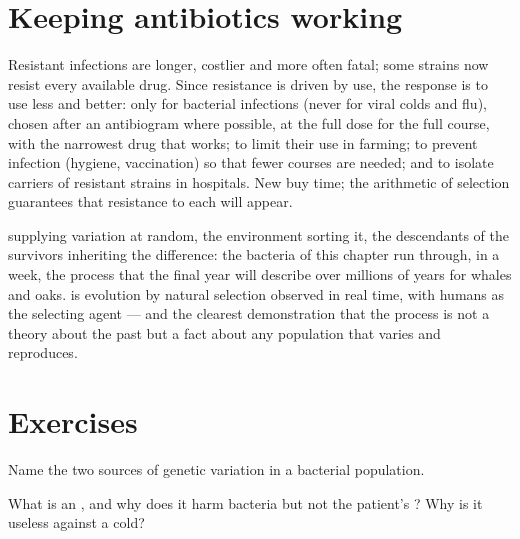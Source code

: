 \section{Keeping antibiotics working}

\begin{proposition}\label{prop:g11:antibiotic-resistance:consequences}
Resistant infections are longer, costlier and more often fatal;
some strains now resist every available drug. Since resistance is
driven by use, the response is to use  less and better:
only for bacterial infections (never for viral colds and flu),
chosen after an antibiogram where possible, at the full dose for the
full course, with the narrowest drug that works; to limit their use
in farming; to prevent infection (hygiene, vaccination) so that fewer
courses are needed; and to isolate carriers of resistant strains in
hospitals. New  buy time; the arithmetic of selection
guarantees that resistance to each will appear.
\end{proposition}
\admitted

\begin{remark}\label{rem:g11:antibiotic-resistance:evolution}
 supplying variation at random, the environment sorting it,
the descendants of the survivors inheriting the difference: the
bacteria of this chapter run through, in a week, the process that the
final year will describe over millions of years for whales and oaks.
 is evolution by natural selection observed in
real time, with humans as the selecting agent --- and the clearest
demonstration that the process is not a theory about the past but a
fact about any population that varies and reproduces.
\end{remark}

\section{Exercises}

\begin{exercise}[$\star$]\label{exo:g11:antibiotic-resistance:1}
Name the two sources of genetic variation in a bacterial population.
\end{exercise}

\begin{exercise}[$\star$]\label{exo:g11:antibiotic-resistance:2}
What is an , and why does it harm bacteria but not the
patient's ? Why is it useless against a cold?
\end{exercise}

